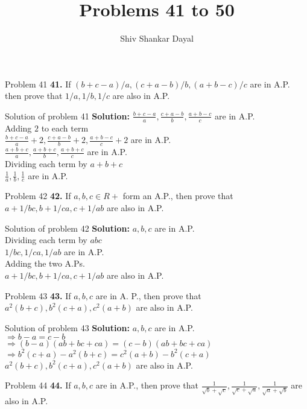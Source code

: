 \documentclass[aspectratio=1610,8pt]{beamer}
\title{Problems 41 to 50}
\author[Shiv Shankar Dayal]{Shiv Shankar Dayal}
\begin{document}
\begin{frame}
       \titlepage
\end{frame}
\begin{frame}{Problem 41}
  \textbf{41.} If $(b + c - a)/a, (c + a - b)/b, (a + b - c)/c$ are in
  A.P. then prove that $1/a, 1/b, 1/c$ are also in A.P.
\end{frame}
\begin{frame}{Solution of problem 41}
  \textbf{Solution:} $\frac{b + c - a}{a}, \frac{c + a - b}{b}, \frac{a + b -
    c}{c}$ are in A.P.\\
  Adding $2$ to each term\\
  $\frac{b + c - a}{a} + 2, \frac{c + a - b}{b} + 2, \frac{a + b - c}{c} + 2$
  are in A.P.\\
  $\frac{a + b + c}{a}, \frac{a + b + c}{b}, \frac{a + b + c}{c}$ are in A.P.\\
  Dividing each term by $a + b + c$\\
  $\frac{1}{a}, \frac{1}{b}, \frac{1}{c}$ are in A.P.
\end{frame}
\begin{frame}{Problem 42}
  \textbf{42.} If $a, b, c \in R+$ form an A.P., then prove that $a + 1/bc, b +
  1/ca, c + 1/ab$ are also in A.P.
\end{frame}
\begin{frame}{Solution of problem 42}
  \textbf{Solution:} $a, b, c$ are in A.P.\\
  Dividing each term by $abc$\\
  $1/bc, 1/ca, 1/ab$ are in A.P.\\
  Adding the two A.Ps.\\
  $a + 1/bc, b + 1/ca, c + 1/ab$ are also in A.P.
\end{frame}
\begin{frame}{Problem 43}
  \textbf{43.} If $a, b, c$ are in A. P., then prove that $a^2(b + c), b^2(c +
  a), c^2(a + b)$ are also in A.P.
\end{frame}
\begin{frame}{Solution of problem 43}
  \textbf{Solution:} $a, b, c$ are in A.P.\\
  $\Rightarrow b - a = c - b$\\
  $\Rightarrow (b - a)(ab + bc + ca) = (c - b)(ab + bc + ca)$\\
  $\Rightarrow b^2(c + a) - a^2(b + c) = c^2(a + b) - b^2(c + a)$\\
  $a^2(b + c), b^2(c + a), c^2(a + b)$ are also in A.P.
\end{frame}
\begin{frame}{Problem 44}
  \textbf{44.} If $a, b, c$ are in A.P., then prove that $\frac{1}{\sqrt{b} +
    \sqrt{c}}, \frac{1}{\sqrt{c} + \sqrt{a}}, \frac{1}{\sqrt{a} + \sqrt{b}}$
  are also in A.P.
\end{frame}
\end{document}
